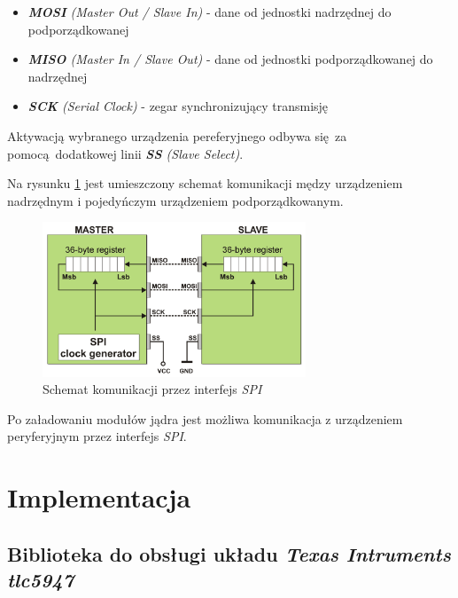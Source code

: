 \documentclass[eng,printmode]{mgr}
\begin{document}
\begin{itemize}
  \item{\emph{\textbf{MOSI} (Master Out / Slave In)} - dane od jednostki nadrzędnej do podporządkowanej}
  \item{\emph{\textbf{MISO} (Master In / Slave Out)} - dane od jednostki podporządkowanej do nadrzędnej}
  \item{\emph{\textbf{SCK} (Serial Clock)} - zegar synchronizujący transmisję}
\end{itemize}

Aktywacją wybranego urządzenia pereferyjnego odbywa się za pomocą dodatkowej linii \emph{\textbf{SS} (Slave Select)}.

Na rysunku \ref{spi} jest umieszczony schemat komunikacji mędzy urządzeniem nadrzędnym i pojedyńczym urządzeniem podporządkowanym.

\begin{figure}[!ht]
    \centering
    \includegraphics[width=0.7\textwidth]{Figures/spi3.png} 
    \caption{Schemat komunikacji przez interfejs \emph{SPI}}
    \label{spi}
\end{figure}

Po załadowaniu modułów jądra jest możliwa komunikacja z urządzeniem peryferyjnym przez interfejs \emph{SPI}.



\chapter{Implementacja}
\section{Biblioteka do obsługi układu \emph{Texas Intruments tlc5947}}
\end{document}
